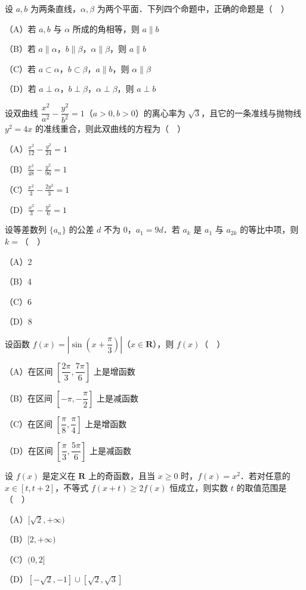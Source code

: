 \begin{question}
设 $a,b$ 为两条直线，$\alpha,\beta$ 为两个平面．下列四个命题中，正确的命题是（　）

（A）若 $a,b$ 与 $\alpha$ 所成的角相等，则 $a\parallel b$

（B）若 $a\parallel\alpha$，$b\parallel\beta$，$\alpha\parallel\beta$，则 $a\parallel b$

（C）若 $a\subset\alpha$，$b\subset\beta$，$a\parallel b$，则 $\alpha\parallel\beta$

（D）若 $a\perp\alpha$，$b\perp\beta$，$\alpha\perp\beta$，则 $a\perp b$

\end{question}
\begin{question}
设双曲线 $\dfrac{x^2}{a^2}-\dfrac{y^2}{b^2}=1$（$a>0,b>0$）的离心率为 $\sqrt3$，且它的一条准线与抛物线 $y^2=4x$ 的准线重合，则此双曲线的方程为（　）

（A）$\frac{x^2}{12}-\frac{y^2}{24}=1$

（B）$\frac{x^2}{48}-\frac{y^2}{96}=1$

（C）$\frac{x^2}{3}-\frac{2y^2}{3}=1$

（D）$\frac{x^2}{3}-\frac{y^2}{6}=1$

\end{question}
\begin{question}
设等差数列 $\{a_n\}$ 的公差 $d$ 不为 $0$，$a_1=9d$．若 $a_k$ 是 $a_1$ 与 $a_{2k}$ 的等比中项，则 $k=$（　）

（A）2

（B）4

（C）6

（D）8

\end{question}
\begin{question}
设函数 $f(x)=\left|\sin\left(x+\dfrac{\pi}{3}\right)\right|$（$x\in\mathbf R$），则 $f(x)$（　）

（A）在区间 $\left[\dfrac{2\pi}{3},\dfrac{7\pi}{6}\right]$ 上是增函数

（B）在区间 $\left[-\pi,-\dfrac{\pi}{2}\right]$ 上是减函数

（C）在区间 $\left[\dfrac{\pi}{8},\dfrac{\pi}{4}\right]$ 上是增函数

（D）在区间 $\left[\dfrac{\pi}{3},\dfrac{5\pi}{6}\right]$ 上是减函数

\end{question}
\begin{question}
设 $f(x)$ 是定义在 $\mathbf R$ 上的奇函数，且当 $x\geqslant 0$ 时，$f(x)=x^2$．若对任意的 $x\in[t,t+2]$，不等式 $f(x+t)\geqslant 2f(x)$ 恒成立，则实数 $t$ 的取值范围是（　）

（A）$[\sqrt2,+\infty)$

（B）$[2,+\infty)$

（C）$(0,2]$

（D）$[-\sqrt2,-1]\cup[\sqrt2,\sqrt3]$

\end{question}

